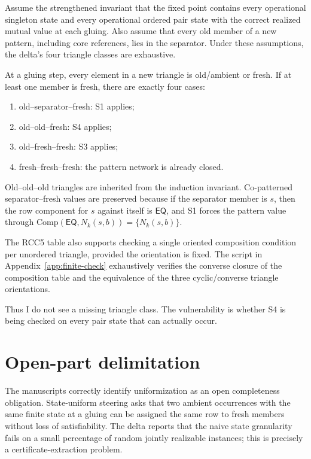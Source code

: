 \documentclass[11pt]{article}
\newcommand{\EQ}{\ensuremath{\mathsf{EQ}}}
\newcommand{\Comp}{\ensuremath{\mathrm{Comp}}}
\begin{document}
Assume the strengthened invariant that the fixed point contains every operational singleton state and every operational ordered pair state with the correct realized mutual value at each gluing.  Also assume that every old member of a new pattern, including core references, lies in the separator.  Under these assumptions, the delta's four triangle classes are exhaustive.

At a gluing step, every element in a new triangle is old/ambient or fresh.  If at least one member is fresh, there are exactly four cases:
\begin{enumerate}[label=(\arabic*)]
  \item old--separator--fresh: S1 applies;
  \item old--old--fresh: S4 applies;
  \item old--fresh--fresh: S3 applies;
  \item fresh--fresh--fresh: the pattern network is already closed.
\end{enumerate}
Old--old--old triangles are inherited from the induction invariant.  Co-patterned separator--fresh values are preserved because if the separator member is \(s\), then the row component for \(s\) against itself is \(\EQ\), and S1 forces the pattern value through \(\Comp(\EQ,N_k(s,b))=\{N_k(s,b)\}\).

The RCC5 table also supports checking a single oriented composition condition per unordered triangle, provided the orientation is fixed.  The script in Appendix~\ref{app:finite-check} exhaustively verifies the converse closure of the composition table and the equivalence of the three cyclic/converse triangle orientations.

Thus I do not see a missing triangle class.  The vulnerability is whether S4 is being checked on every pair state that can actually occur.

\section{Open-part delimitation}

The manuscripts correctly identify uniformization as an open completeness obligation.  State-uniform steering asks that two ambient occurrences with the same finite state at a gluing can be assigned the same row to fresh members without loss of satisfiability.  The delta reports that the naive state granularity fails on a small percentage of random jointly realizable instances; this is precisely a certificate-extraction problem.
\end{document}
